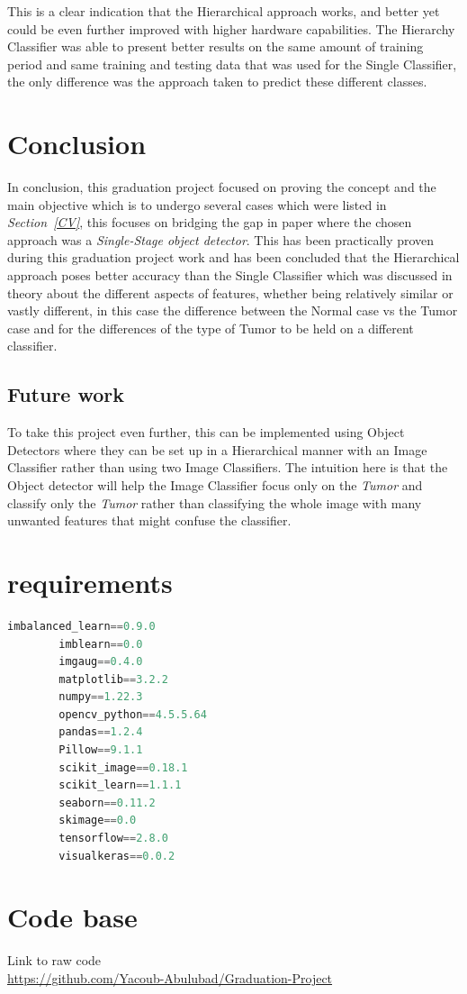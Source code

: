 \documentclass[12pt]{extarticle}
\begin{document}
 	This is a clear indication that the Hierarchical approach works, and better yet could be even further improved with higher hardware capabilities. The Hierarchy Classifier was able to present better results on the same amount of training period and same training and testing data that was used for the Single Classifier, the only difference was the approach taken to predict these different classes.
	
	\section{Conclusion}
	In conclusion, this graduation project focused on proving the concept and the main objective which is to undergo several cases which were listed in \emph{Section~\ref{CV}}, this focuses on bridging the gap in paper \cite{one_shot} where the chosen approach was a \emph{Single-Stage object detector}. This has been practically proven during this graduation project work and has been concluded that the Hierarchical approach poses better accuracy than the Single Classifier which was discussed in theory about the different aspects of features, whether being relatively similar or vastly different, in this case the difference between the Normal case vs the Tumor case and for the differences of the type of Tumor to be held on a different classifier. 
	\subsection{Future work}
	To take this project even further, this can be implemented using Object Detectors where they can be set up in a Hierarchical manner with an Image Classifier rather than using two Image Classifiers. The intuition here is that the Object detector will help the Image Classifier focus only on the \emph{Tumor} and classify only the \emph{Tumor} rather than classifying the whole image with many unwanted features that might confuse the classifier. 
	\newpage
	\appendix
	\section{requirements}\label{appendix:libraries}
	\begin{lstlisting}[language=Python, label=requiremtns]
		imbalanced_learn==0.9.0
		imblearn==0.0
		imgaug==0.4.0
		matplotlib==3.2.2
		numpy==1.22.3
		opencv_python==4.5.5.64
		pandas==1.2.4
		Pillow==9.1.1
		scikit_image==0.18.1
		scikit_learn==1.1.1
		seaborn==0.11.2
		skimage==0.0
		tensorflow==2.8.0
		visualkeras==0.0.2
	\end{lstlisting}
	\newpage
	\section{Code base}\label{appendix:code}
	Link to raw code\\ \href{https://github.com/Yacoub-Abulubad/Graduation-Project}{https://github.com/Yacoub-Abulubad/Graduation-Project}
	\newpage
	
	
	
	
	
\end{document}
